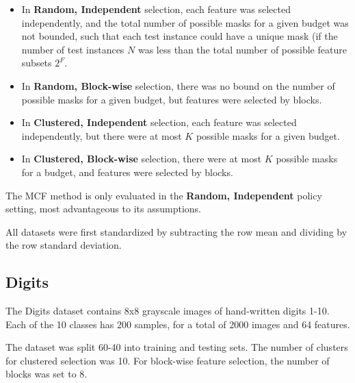 \begin{itemize}
\item
In \textbf{Random, Independent} selection, each feature was selected independently, and the total number of possible masks for a given budget was not bounded, such that each test instance could have a unique mask (if the number of test instances $N$ was less than the total number of possible feature subsets $2^F$.

\item
In \textbf{Random, Block-wise} selection, there was no bound on the number of possible masks for a given budget, but features were selected by blocks.

\item
In \textbf{Clustered, Independent} selection, each feature was selected independently, but there were at most $K$ possible masks for a given budget.

\item
In \textbf{Clustered, Block-wise} selection, there were at most $K$ possible masks for a budget, and features were selected by blocks.
\end{itemize}

The MCF method is only evaluated in the \textbf{Random, Independent} policy setting, most advantageous to its assumptions.

All datasets were first standardized by subtracting the row mean and dividing by the row standard deviation.

\subsection{Digits}
The Digits dataset contains 8x8 grayscale images of hand-written digits 1-10.
Each of the 10 classes has 200 samples, for a total of 2000 images and 64 features.

The dataset was split 60-40 into training and testing sets.
The number of clusters for clustered selection was 10.
For block-wise feature selection, the number of blocks was set to 8.

